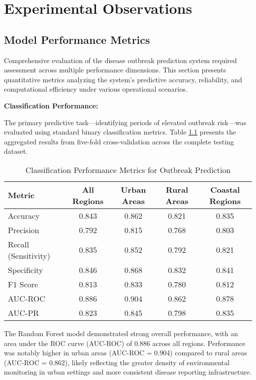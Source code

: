 \documentclass[12pt,a4paper]{report}
\begin{document}
\chapter{Experimental Observations}
\section{Model Performance Metrics}
Comprehensive evaluation of the disease outbreak prediction system required assessment across multiple performance dimensions. This section presents quantitative metrics analyzing the system's predictive accuracy, reliability, and computational efficiency under various operational scenarios.

\textbf{Classification Performance:}

The primary predictive task—identifying periods of elevated outbreak risk—was evaluated using standard binary classification metrics. Table \ref{tab:classification_metrics} presents the aggregated results from five-fold cross-validation across the complete testing dataset.

\begin{table}[h]
\centering
\caption{Classification Performance Metrics for Outbreak Prediction}
\label{tab:classification_metrics}
\begin{tabular}{@{}lcccc@{}}
\toprule
\textbf{Metric} & \textbf{All Regions} & \textbf{Urban Areas} & \textbf{Rural Areas} & \textbf{Coastal Regions} \\
\midrule
Accuracy & 0.843 & 0.862 & 0.821 & 0.835 \\
Precision & 0.792 & 0.815 & 0.768 & 0.803 \\
Recall (Sensitivity) & 0.835 & 0.852 & 0.792 & 0.821 \\
Specificity & 0.846 & 0.868 & 0.832 & 0.841 \\
F1 Score & 0.813 & 0.833 & 0.780 & 0.812 \\
AUC-ROC & 0.886 & 0.904 & 0.862 & 0.878 \\
AUC-PR & 0.823 & 0.845 & 0.798 & 0.835 \\
\bottomrule
\end{tabular}
\end{table}

The Random Forest model demonstrated strong overall performance, with an area under the ROC curve (AUC-ROC) of 0.886 across all regions. Performance was notably higher in urban areas (AUC-ROC = 0.904) compared to rural areas (AUC-ROC = 0.862), likely reflecting the greater density of environmental monitoring in urban settings and more consistent disease reporting infrastructure.
\end{document}
